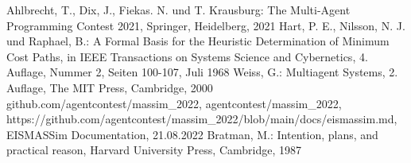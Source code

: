\documentclass[runningheads]{llncs}
\begin{document}
%
%
%
% 
% 
%
\begin{thebibliography}{8}
	Ahlbrecht, T., Dix, J., Fiekas. N. und T. Krausburg: The Multi-Agent Programming Contest 2021, Springer, Heidelberg, 2021
	Hart, P. E., Nilsson, N. J. und Raphael, B.: A Formal Basis for the Heuristic Determination of Minimum Cost Paths, in IEEE Transactions on Systems Science and Cybernetics, 4. Auflage, Nummer 2, Seiten 100-107, Juli 1968
	Weiss, G.: Multiagent Systems, 2. Auflage, The MIT Press, Cambridge, 2000
	github.com/agentcontest/massim\_2022, agentcontest/massim\_2022, \\ https://github.com/agentcontest/massim\_2022/blob/main/docs/eismassim.md, EISMASSim Documentation, 21.08.2022
	Bratman, M.: Intention, plans, and practical reason, Harvard University Press, Cambridge, 1987
\end{thebibliography}
\end{document}
